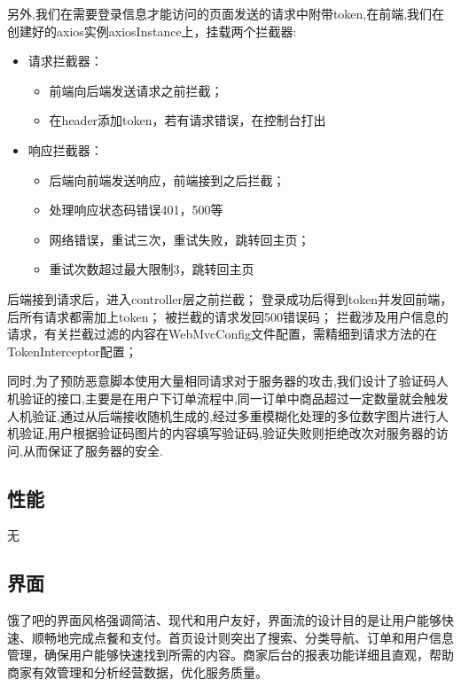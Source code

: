 另外,我们在需要登录信息才能访问的页面发送的请求中附带token,在前端,我们在创建好的axios实例axiosInstance上，挂载两个拦截器:
\begin{itemize}
\item 请求拦截器：
\begin{itemize}
    \item 前端向后端发送请求之前拦截；
    \item 在header添加token，若有请求错误，在控制台打出
\end{itemize}
\item 响应拦截器：
\begin{itemize}
    \item 后端向前端发送响应，前端接到之后拦截；
    \item 处理响应状态码错误401，500等
    \item 网络错误，重试三次，重试失败，跳转回主页；
    \item 重试次数超过最大限制3，跳转回主页
\end{itemize}
\end{itemize}

后端接到请求后，进入controller层之前拦截；
登录成功后得到token并发回前端，后所有请求都需加上token；
被拦截的请求发回500错误码；
拦截涉及用户信息的请求，有关拦截过滤的内容在WebMvcConfig文件配置，需精细到请求方法的在TokenInterceptor配置；

同时,为了预防恶意脚本使用大量相同请求对于服务器的攻击,我们设计了验证码人机验证的接口,主要是在用户下订单流程中,同一订单中商品超过一定数量就会触发人机验证,通过从后端接收随机生成的,经过多重模糊化处理的多位数字图片进行人机验证,用户根据验证码图片的内容填写验证码,验证失败则拒绝改次对服务器的访问,从而保证了服务器的安全.




\subsection{性能}
无
\subsection{界面}
饿了吧的界面风格强调简洁、现代和用户友好，界面流的设计目的是让用户能够快速、顺畅地完成点餐和支付。首页设计则突出了搜索、分类导航、订单和用户信息管理，确保用户能够快速找到所需的内容。商家后台的报表功能详细且直观，帮助商家有效管理和分析经营数据，优化服务质量。
